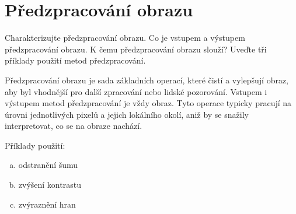\section{Předzpracování obrazu}
Charakterizujte předzpracování obrazu. Co je vstupem a výstupem předzpracování obrazu. K čemu předzpracování 
obrazu slouží? Uveďte tři příklady použití metod předzpracování.

Předzpracování obrazu je sada základních operací, které čistí a vylepšují obraz, aby byl vhodnější pro další 
zpracování nebo lidské pozorování.
Vstupem i výstupem metod předzpracování je vždy obraz. Tyto operace typicky pracují na úrovni jednotlivých pixelů a 
jejich lokálního okolí, aniž by se snažily interpretovat, co se na obraze nachází.

Příklady použití:
\begin{enumerate}[(a)]
    \item odstranění šumu
    \item zvýšení kontrastu
    \item zvýraznění hran
\end{enumerate}
